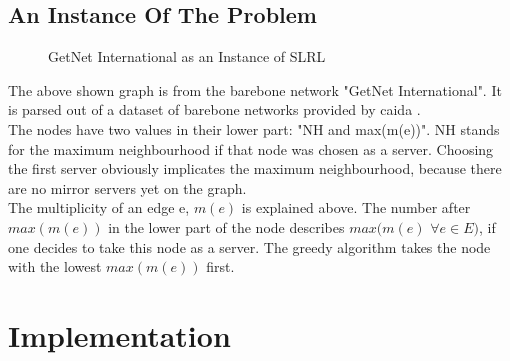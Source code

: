 \documentclass [12pt]{article}
\begin{document}
\subsection{An Instance Of The Problem}
\begin{figure}[H]
  \centering
  \caption{GetNet International as an Instance of SLRL}
\end{figure}
The above shown graph is from the barebone network "GetNet International".
It is parsed out of a dataset of barebone networks provided by caida \cite{caidabarebones}.
\\
The nodes have two values in their lower part: "NH and max(m(e))". NH stands for 
the maximum neighbourhood if that node was chosen as a server. Choosing the first
server obviously implicates the maximum neighbourhood, because there are
no mirror servers yet on the graph.\\
The multiplicity of an edge e, $m(e)$ is explained above. The number after
$max(m(e))$ in the lower part of the node describes $max(m(e)$ $ \forall e \in E)$,
if one decides to take this node as a server.
The greedy algorithm takes the node with the lowest $max(m(e))$ first.

\section{Implementation}
\end{document}
